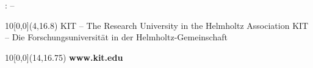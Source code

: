 \begin{titlepage}
\vspace{2cm}
\begin{center}
\large{: \timestart \hspace*{0.25cm} -- \hspace*{0.25cm} \timeend}
\end{center}


\begin{textblock}{10}[0,0](4,16.8)
\tiny{ 
		{KIT -- The Research University in the Helmholtz Association}
		{KIT -- Die Forschungsuniversität in der Helmholtz-Gemeinschaft}
}
\end{textblock}

\begin{textblock}{10}[0,0](14,16.75)
\large{
	\textbf{www.kit.edu} 
}
\end{textblock}

\end{titlepage}
